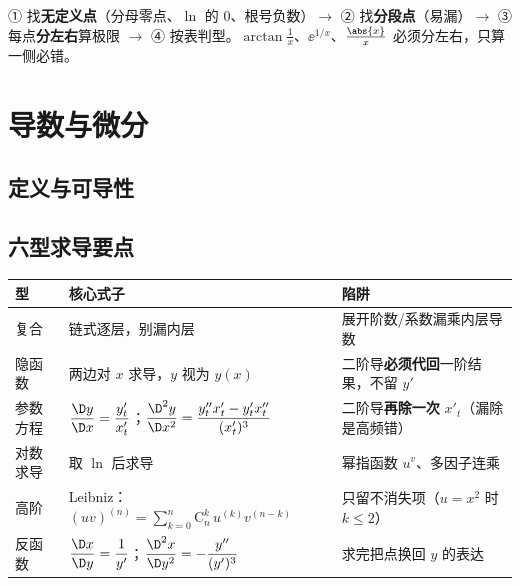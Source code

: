 \documentclass[UTF8,11pt]{ctexart}
\begin{document}
\begin{warnbox}[找间断点四步]
① 找\textbf{无定义点}（分母零点、$\ln$ 的 $0$、根号负数）$\to$ ② 找\textbf{分段点}（易漏）$\to$ ③ 每点\textbf{分左右}算极限 $\to$ ④ 按表判型。$\arctan\frac1x$、$\ee^{1/x}$、$\frac{\abs{x}}{x}$ 必须分左右，只算一侧必错。
\end{warnbox}

\section{导数与微分}

\subsection{定义与可导性}


\subsection{六型求导要点}

\begin{center}
\renewcommand{\arraystretch}{1.2}
\begin{tabular}{@{}p{2.2cm}p{6.9cm}p{5.8cm}@{}}
\toprule
\textbf{型} & \textbf{核心式子} & \textbf{陷阱} \\
\midrule
复合 & 链式逐层，别漏内层 & 展开阶数/系数漏乘内层导数 \\
隐函数 & 两边对 $x$ 求导，$y$ 视为 $y(x)$ & 二阶导\textbf{必须代回}一阶结果，不留 $y'$ \\
参数方程 & $\dfrac{\D y}{\D x}=\dfrac{y'_t}{x'_t}$；$\dfrac{\D^2y}{\D x^2}=\dfrac{y''_tx'_t-y'_tx''_t}{(x'_t)^3}$ & 二阶导\textbf{再除一次} $x'_t$（漏除是高频错） \\
对数求导 & 取 $\ln$ 后求导 & 幂指函数 $u^v$、多因子连乘 \\
高阶 & Leibniz：$(uv)^{(n)}=\sum_{k=0}^{n}\mathrm{C}_n^k\,u^{(k)}v^{(n-k)}$ & 只留不消失项（$u=x^2$ 时 $k\le2$）\\
反函数 & $\dfrac{\D x}{\D y}=\dfrac{1}{y'}$；$\dfrac{\D^2x}{\D y^2}=-\dfrac{y''}{(y')^3}$ & 求完把点换回 $y$ 的表达 \\
\bottomrule
\end{tabular}
\end{center}
\end{document}
